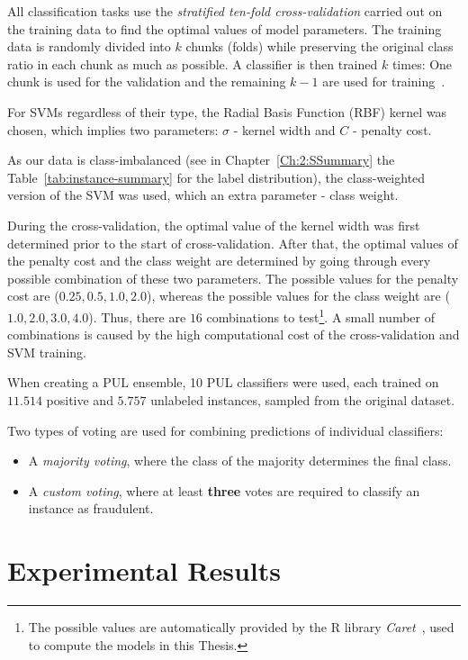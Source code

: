 All classification tasks use the \textit{stratified ten-fold cross-validation} carried out on the training data to find the optimal values of model parameters. The training data is randomly divided into \(k\) chunks (folds) while preserving the original class ratio in each chunk as much as possible. A classifier is then trained \(k\) times: One chunk is used for the validation and the remaining \(k-1\) are used for  training~\cite{Kohavi95}.

For SVMs regardless of their type, the Radial Basis Function (RBF) kernel was chosen, which implies two parameters: \(\sigma\) - kernel width and \(C\) - penalty cost.

As our data is class-imbalanced (see in Chapter~\ref{Ch:2:SSummary} the Table~\ref{tab:instance-summary} for the label distribution), the class-weighted version of the SVM was used, which an extra parameter - class weight.

During the cross-validation, the optimal value of the kernel width was first determined prior to the start of cross-validation. After that, the optimal values of the penalty cost and the class weight are determined by going through every possible combination of these two parameters. The possible values for the penalty cost are ($0.25,0.5,1.0,2.0$), whereas the possible values for the class weight are ($1.0,2.0,3.0,4.0$). Thus, there are $16$ combinations to test\footnote{The possible values are automatically provided by the R library \textit{Caret}~\cite{JSSv028i05}, used to compute the models in this Thesis.}. A small number of combinations is caused by the high computational cost of the cross-validation and SVM training.

When creating a PUL ensemble, 10 PUL classifiers were used, each trained on \(11.514\) positive and \(5.757\) unlabeled instances, sampled from the original dataset.

Two types of voting are used for combining predictions of individual classifiers:

\begin{itemize}
    \item A \textit{majority voting}, where the class of the majority determines the final class.
    \item A \textit{custom voting}, where at least \textbf{three} votes are required to classify an instance as fraudulent.
\end{itemize}

\section{Experimental Results}\label{Chapter:5:Results}

